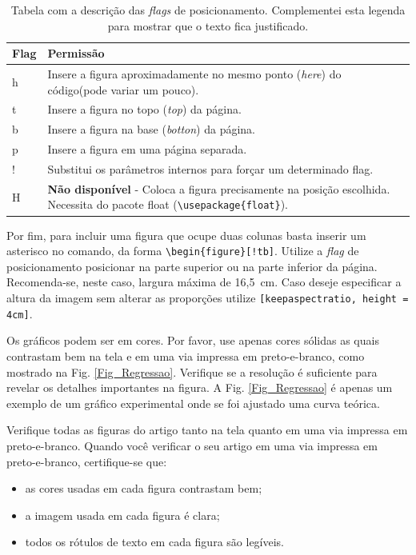 \documentclass{RBClatex}
\begin{document}
\begin{table}[!htb]
	\centering
	\caption{Tabela com a descrição das \textit{flags} de posicionamento. Complementei esta legenda para mostrar que o texto fica justificado.}
	\label{Tab:Flags_Floats}
	\begin{tabular}{|C{1cm}|L{7cm}|}
		\hline
		Flag & Permissão                                                                              \\ \hline
		h    & Insere a figura aproximadamente no mesmo ponto (\textit{here}) do código(pode variar um pouco). \\ \hline
		t    & Insere a figura no topo (\textit{top}) da página.                                               \\ \hline
		b    & Insere a figura na base (\textit{botton}) da página.                                            \\ \hline
		p    & Insere a figura em uma página separada.                                                \\ \hline
		!    & Substitui os parâmetros internos para forçar um determinado flag.                      \\ \hline
		H    & \textbf{Não disponível} - Coloca a figura precisamente na posição escolhida. Necessita do pacote float (\verb|\usepackage{float}|).                                      \\ \hline 
	\end{tabular}
\end{table}

Por fim, para incluir uma figura que ocupe duas colunas basta inserir um asterisco no comando, da forma \verb|\begin{figure}[!tb]|. Utilize a \textit{flag} de posicionamento posicionar na parte superior ou na parte inferior da página. Recomenda-se, neste caso, largura máxima de 16,5~cm. Caso deseje especificar a altura da imagem sem alterar as proporções utilize \verb|[keepaspectratio, height = 4cm]|.

Os gráficos podem ser em cores. Por favor, use apenas cores sólidas as quais contrastam bem na tela e em uma via impressa em preto-e-branco, como mostrado na Fig. \ref{Fig_Regressao}. Verifique se a resolução é suficiente para revelar os detalhes importantes na figura. A Fig. \ref{Fig_Regressao} é apenas um exemplo de um gráfico experimental onde se foi ajustado uma curva teórica.

Verifique todas as figuras do artigo tanto na tela quanto em uma via impressa em preto-e-branco. Quando você verificar o seu artigo em uma via impressa em preto-e-branco, certifique-se que:
\begin{itemize} [noitemsep,topsep=0pt,leftmargin=*,labelindent=7.5mm,labelsep=2mm]
	\item as cores usadas em cada figura contrastam bem;
	\item a imagem usada em cada figura é clara;
	\item todos os rótulos de texto em cada figura são legíveis.
\end{itemize}
\end{document}
